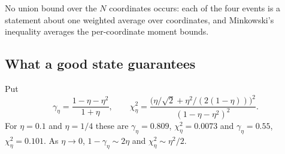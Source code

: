 \documentclass[11pt]{article}
\theoremstyle{definition}\newtheorem{definition}[theorem]{Definition}
\theoremstyle{remark}\newtheorem{remark}[theorem]{Remark}
\newcommand{\1}{\mathbf 1}
\begin{document}
No union bound over the $N$ coordinates occurs: each of the four events
is a statement about one weighted average over coordinates, and
Minkowski's inequality averages the per-coordinate moment bounds.
\subsection{What a good state guarantees}
Put
\begin{equation}\label{eq:gamma-chi}
 \gamma_\eta=\frac{1-\eta-\eta^2}{1+\eta},\qquad
 \chi_\eta^2=\frac{\bigl(\eta/\sqrt2+\eta^2/(2(1-\eta))\bigr)^2}{(1-\eta-\eta^2)^2}.
\end{equation}
For $\eta=0.1$ and $\eta=1/4$ these are $\gamma_\eta=0.809$,
$\chi^2_\eta=0.0073$ and $\gamma_\eta=0.55$, $\chi^2_\eta=0.101$. As
$\eta\to0$, $1-\gamma_\eta\sim2\eta$ and $\chi^2_\eta\sim\eta^2/2$.
\end{document}
